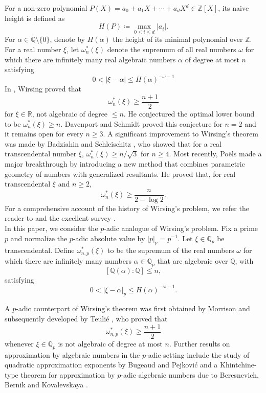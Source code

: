 \documentclass[12pt,reqno]{amsart}
\theoremstyle{definition}
\theoremstyle{remark}
\newcommand{\Q}{\mathbb Q}
\newcommand{\Z}{\mathbb Z}
\newcommand{\R}{\mathbb R}
\newcommand{\Qp}{\mathbb Q_p}
\begin{document}
For a non-zero polynomial $P(X)=a_0+a_1X+\cdots+a_dX^d\in\Z[X]$, its naive height is defined as
\begin{equation*}
    H(P)\coloneqq\max_{0\leq i\leq d}|a_i|.
\end{equation*}
For $\alpha \in \overline{\Q}\setminus \{0\}$, denote by $H(\alpha)$ the height of its minimal polynomial over $\Z$. For a real number $\xi$, let $\omega_n^*(\xi)$ denote the
supremum of all real numbers $\omega$ for which there are infinitely many real algebraic numbers $\alpha$ of degree at most $n$ satisfying
$$
0<|\xi-\alpha|\leq H(\alpha)^{-\omega-1}
$$
In \cite{Wirsing}, Wirsing proved that
$$
\omega_n^*(\xi)\geq\frac{n+1}{2}
$$
for $\xi\in\R$, not algebraic of degree $\leq n$. He conjectured the optimal lower bound to be $\omega_n^*(\xi)\geq n$. Davenport and Schmidt \cite{DavenportSchmidt} proved this conjecture for $n=2$ and it
remains open for every $n\geq3$. A significant improvement to Wirsing's theorem was made by Badziahin
and Schleischitz \cite{BadziahinSchleischitz}, who showed that for a real transcendental number $\xi$, $\omega_n^*(\xi) \geq n/\sqrt3$ for $n\geq4$. Most recently, Po\"els
\cite{PoelsWirsing} made a major breakthrough by introducing a new method that combines parametric geometry of numbers with generalized resultants. He proved that, for real transcendental $\xi$ and $n\geq2$,
\begin{equation}\label{eq:poels-bound}
\omega_n^*(\xi)\geq\frac{n}{2-\log2}.
\end{equation}
For a comprehensive account of the history of Wirsing's problem, we refer the reader to
\cite{BugeaudBook} and the excellent survey \cite{BugeaudSurvey}.\\

In this paper, we consider the $p$-adic analogue of Wirsing's problem. Fix a prime $p$ and normalize the $p$-adic absolute value by $|p|_p=p^{-1}$. Let $\xi\in\Qp$ be transcendental. Define $\omega^*_{n,p}(\xi)$ to be the
supremum of the real numbers $\omega$ for which there are infinitely many numbers $\alpha \in \Qp$ that are algebraic over $\Q$, with
$$
[\Q(\alpha):\Q]\leq n,
$$
satisfying
$$
0<|\xi-\alpha|_p\leq H(\alpha)^{-\omega-1}.
$$

\noindent
A $p$-adic counterpart of Wirsing's theorem was first obtained by Morrison \cite{Morrison} and subsequently developed by Teuli\'e \cite{Teulie}, who proved that
\begin{equation}\label{eq:morrison-bound}
\omega^*_{n,p}(\xi)\geq\frac{n+1}{2}
\end{equation}
whenever $\xi\in\Qp$ is not algebraic of degree at most $n$. Further results on approximation by algebraic numbers in the $p$-adic setting include the study of quadratic approximation exponents by Bugeaud and Pejkovi\'c \cite{BugeaudPejkovic} and a Khintchine-type theorem
for approximation by $p$-adic algebraic numbers due to Beresnevich, Bernik and Kovalevskaya \cite{BeresnevichBernikKovalevskaya}.\\
\end{document}
